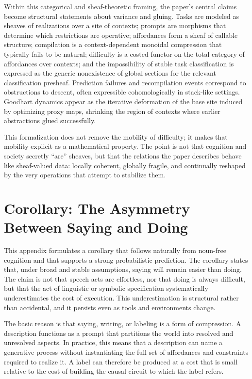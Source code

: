 \documentclass[12pt]{article}
\begin{document}
Within this categorical and sheaf-theoretic framing, the paper’s central claims become structural statements about variance and gluing. Tasks are modeled as sheaves of realizations over a site of contexts; prompts are morphisms that determine which restrictions are operative; affordances form a sheaf of callable structure; compilation is a context-dependent monoidal compression that typically fails to be natural; difficulty is a costed functor on the total category of affordances over contexts; and the impossibility of stable task classification is expressed as the generic nonexistence of global sections for the relevant classification presheaf. Prediction failures and recompilation events correspond to obstructions to descent, often expressible cohomologically in stack-like settings. Goodhart dynamics appear as the iterative deformation of the base site induced by optimizing proxy maps, shrinking the region of contexts where earlier abstractions glued successfully.

This formalization does not remove the mobility of difficulty; it makes that mobility explicit as a mathematical property. The point is not that cognition and society secretly ``are'' sheaves, but that the relations the paper describes behave like sheaf-valued data: locally coherent, globally fragile, and continually reshaped by the very operations that attempt to stabilize them.

\section{Corollary: The Asymmetry Between Saying and Doing}

This appendix formulates a corollary that follows naturally from noun-free cognition and that supports a strong probabilistic prediction. The corollary states that, under broad and stable assumptions, saying will remain easier than doing. The claim is not that speech acts are effortless, nor that doing is always difficult, but that the act of linguistic or symbolic specification systematically underestimates the cost of execution. This underestimation is structural rather than accidental, and it persists even as tools and environments change.

The basic reason is that saying, writing, or labeling is a form of compression. A description functions as a prompt that partitions the world into resolved and unresolved aspects. In practice, this means that a description can name a generative process without instantiating the full set of affordances and constraints required to realize it. A label can therefore be produced at a cost that is small relative to the cost of building the causal circuit to which the label refers.
\end{document}
